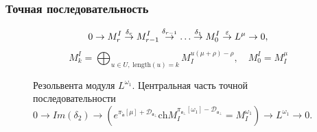 \documentclass[pdftex]{beamer}
\newcommand{\afb}{\mathfrak{a}_{\bot}}
\newcommand{\aft}{\widetilde{\mathfrak{a}}}
\theoremstyle{definition} \newtheorem{Def}{Определение}
\begin{document}
\begin{frame}
  \frametitle{Точная последовательность}
  \begin{equation*}
    0\rightarrow M_{r}^{I}\overset{\delta _{r}}{\rightarrow }M_{r-1}^{I}\overset{%
      \delta _{r-1}}{\rightarrow }\ldots \overset{\delta _{1}}{\rightarrow }%
    M_{0}^{I}\overset{\varepsilon }{\rightarrow }L^{\mu }\rightarrow 0,
  \end{equation*}
  \begin{equation*}
    M_{k}^{I}=\bigoplus_{u\in U,\;\mathrm{length}\left( u\right)
      =k}M_{I}^{u\left( \mu +\rho \right) -\rho },\quad M_{0}^{I}=M_{I}^{\mu }
  \end{equation*}
  \vspace{-0.5cm}
  \begin{figure}[h!bt]
    \noindent{}
\vspace{-0.5cm}
    \caption{
      Резольвента модуля $L^{\omega_1}$.  Центральная часть точной последовательности
      $0 \to Im(\delta_2) \to \left( e^{\pi _{\aft}\left[ \mu \right] + \mathcal{D}_{\afb}}\mathrm{ch}M_{I}^{\pi _{\afb}\left[ \omega_1 \right] -
          \mathcal{D}_{\afb} }=M^{\omega_1}_{I}\right) \to
      L^{\omega_1}\to 0 $.  
    }
  \end{figure}
\end{frame}
\end{document}
